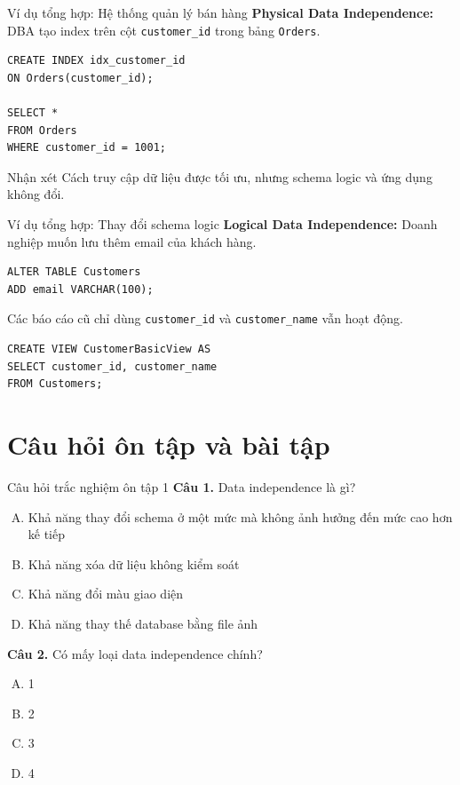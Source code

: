 \documentclass[aspectratio=169,11pt]{beamer}
\begin{document}
\begin{frame}[fragile]{Ví dụ tổng hợp: Hệ thống quản lý bán hàng}
\textbf{Physical Data Independence:} DBA tạo index trên cột \texttt{customer\_id} trong bảng \texttt{Orders}.

\begin{lstlisting}[style=sqlstyle]
CREATE INDEX idx_customer_id
ON Orders(customer_id);

SELECT *
FROM Orders
WHERE customer_id = 1001;
\end{lstlisting}

\begin{block}{Nhận xét}
Cách truy cập dữ liệu được tối ưu, nhưng schema logic và ứng dụng không đổi.
\end{block}
\end{frame}

\begin{frame}[fragile]{Ví dụ tổng hợp: Thay đổi schema logic}
\textbf{Logical Data Independence:} Doanh nghiệp muốn lưu thêm email của khách hàng.

\begin{lstlisting}[style=sqlstyle]
ALTER TABLE Customers
ADD email VARCHAR(100);
\end{lstlisting}

Các báo cáo cũ chỉ dùng \texttt{customer\_id} và \texttt{customer\_name} vẫn hoạt động.

\begin{lstlisting}[style=sqlstyle]
CREATE VIEW CustomerBasicView AS
SELECT customer_id, customer_name
FROM Customers;
\end{lstlisting}
\end{frame}

\section{Câu hỏi ôn tập và bài tập}

\begin{frame}{Câu hỏi trắc nghiệm ôn tập 1}
\small
\textbf{Câu 1.} Data independence là gì?
\begin{enumerate}[A.]
  \item Khả năng thay đổi schema ở một mức mà không ảnh hưởng đến mức cao hơn kế tiếp
  \item Khả năng xóa dữ liệu không kiểm soát
  \item Khả năng đổi màu giao diện
  \item Khả năng thay thế database bằng file ảnh
\end{enumerate}

\textbf{Câu 2.} Có mấy loại data independence chính?
\begin{enumerate}[A.]
  \item 1
  \item 2
  \item 3
  \item 4
\end{enumerate}
\end{frame}
\end{document}

